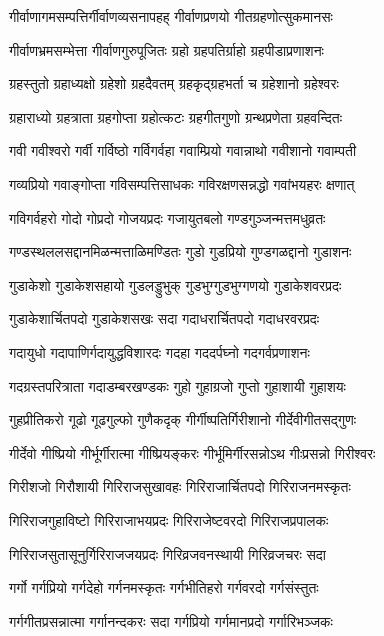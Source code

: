 \twolineshloka
{गीर्वाणागमसम्पत्तिर्गीर्वाणव्यसनापहह्}%
{गीर्वाणप्रणयो गीतग्रहणोत्सुकमानसः}%

\twolineshloka
{गीर्वाणभ्रमसम्भेत्ता गीर्वाणगुरुपूजितः}%
{ग्रहो ग्रहपतिर्ग्राहो ग्रहपीडाप्रणाशनः}%

\twolineshloka
{ग्रहस्तुतो ग्रहाध्यक्षो ग्रहेशो ग्रहदैवतम्}%
{ग्रहकृद्ग्रहभर्ता च ग्रहेशानो ग्रहेश्वरः}%

\twolineshloka
{ग्रहाराध्यो ग्रहत्राता ग्रहगोप्ता ग्रहोत्कटः}%
{ग्रहगीतगुणो ग्रन्थप्रणेता ग्रहवन्दितः}%

\twolineshloka
{गवी गवीश्वरो गर्वी गर्विष्ठो गर्विगर्वहा}%
{गवाम्प्रियो गवान्नाथो गवीशानो गवाम्पती}%

\twolineshloka
{गव्यप्रियो गवाङ्गोप्ता गविसम्पत्तिसाधकः}%
{गविरक्षणसन्नद्धो गवांभयहरः क्षणात्}%

\twolineshloka
{गविगर्वहरो गोदो गोप्रदो गोजयप्रदः}%
{गजायुतबलो गण्डगुञ्जन्मत्तमधुव्रतः}%

\twolineshloka
{गण्डस्थललसद्दानमिळन्मत्ताळिमण्डितः}%
{गुडो गुडप्रियो गुण्डगळद्दानो गुडाशनः}%

\twolineshloka
{गुडाकेशो गुडाकेशसहायो गुडलड्डुभुक्}%
{गुडभुग्गुडभुग्गणयो गुडाकेशवरप्रदः}%

\twolineshloka
{गुडाकेशार्चितपदो गुडाकेशसखः सदा}%
{गदाधरार्चितपदो गदाधरवरप्रदः}%

\twolineshloka
{गदायुधो गदापाणिर्गदायुद्धविशारदः}%
{गदहा गददर्पघ्नो गदगर्वप्रणाशनः}%

\twolineshloka
{गदग्रस्तपरित्राता गदाडम्बरखण्डकः}%
{गुहो गुहाग्रजो गुप्तो गुहाशायी गुहाशयः}%

\twolineshloka
{गुहप्रीतिकरो गूढो गूढगुल्फो गुणैकदृक्}%
{गीर्गीष्पतिर्गिरीशानो गीर्देवीगीतसद्गुणः}%

\twolineshloka
{गीर्देवो गीष्प्रियो गीर्भूर्गीरात्मा गीष्प्रियङ्करः}%
{गीर्भूमिर्गीरसन्नोऽथ गीःप्रसन्नो गिरीश्वरः}%

\twolineshloka
{गिरीशजो गिरौशायी गिरिराजसुखावहः}%
{गिरिराजार्चितपदो गिरिराजनमस्कृतः}%

\twolineshloka
{गिरिराजगुहाविष्टो गिरिराजाभयप्रदः}%
{गिरिराजेष्टवरदो गिरिराजप्रपालकः}%

\twolineshloka
{गिरिराजसुतासूनुर्गिरिराजजयप्रदः}%
{गिरिव्रजवनस्थायी गिरिव्रजचरः सदा}%

\twolineshloka
{गर्गो गर्गप्रियो गर्गदेहो गर्गनमस्कृतः}%
{गर्गभीतिहरो गर्गवरदो गर्गसंस्तुतः}%

\twolineshloka
{गर्गगीतप्रसन्नात्मा गर्गानन्दकरः सदा}%
{गर्गप्रियो गर्गमानप्रदो गर्गारिभञ्जकः}%

